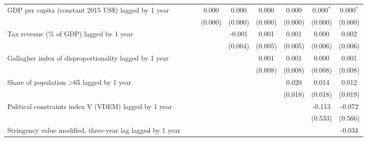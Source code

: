 \begin{tabular}{lcccccccc}
   GDP per capita (constant 2015 US\$) lagged by 1 year                    &                &                & 0.000          & 0.000         & 0.000          & 0.000          & 0.000$^{*}$    & 0.000$^{*}$\\   
                                                                           &                &                & (0.000)        & (0.000)       & (0.000)        & (0.000)        & (0.000)        & (0.000)\\   
   Tax revenue (\% of GDP) lagged by 1 year                                &                &                &                & -0.001        & 0.001          & 0.001          & 0.000          & 0.002\\   
                                                                           &                &                &                & (0.004)       & (0.005)        & (0.005)        & (0.006)        & (0.006)\\   
   Gallagher index of disproportionality lagged by 1 year                  &                &                &                &               & 0.001          & 0.001          & 0.000          & 0.001\\   
                                                                           &                &                &                &               & (0.008)        & (0.008)        & (0.008)        & (0.008)\\   
   Share of population >65 lagged by 1 year                                &                &                &                &               &                & 0.020          & 0.014          & 0.012\\   
                                                                           &                &                &                &               &                & (0.018)        & (0.018)        & (0.019)\\   
   Political constraints index V (VDEM) lagged by 1 year                   &                &                &                &               &                &                & -0.113         & -0.072\\   
                                                                           &                &                &                &               &                &                & (0.533)        & (0.566)\\   
   Stringency value modified, three-year lag lagged by 1 year              &                &                &                &               &                &                &                & -0.034\\   

\end{tabular}
